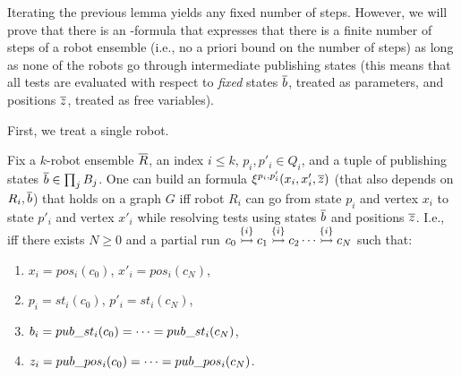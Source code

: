 Iterating the previous lemma yields any fixed number of steps. However, we will prove that there is an \msol-formula that expresses that there is a finite number of steps of a robot ensemble (i.e., no a priori bound on the number of steps) as long as none of the robots go through intermediate publishing states (this means that 
all tests are evaluated with respect to \emph{fixed} states $\tup{b}$, treated as parameters, and positions $\tup{z}$, treated as free variables).

First, we treat a single robot.

\begin{lemma} \label{lem:zeta} 
Fix a $k$-robot ensemble $\tup{R}$, an index $i \leq k$, $p_i,p'_i \in Q_i$, and a tuple of publishing states $\tup{b} \in \prod_j B_j$.
One can build an \msol formula $\xi^{p_i,p'_i}(x_i,x'_i,\tup{z})$ (that also depends on $R_i,\tup{b}$) that holds on a graph $G$ iff
robot $R_i$ can go from state $p_i$ and vertex $x_i$ to state $p'_i$ and vertex $x'_i$ while resolving tests using states $\tup{b}$ and positions $\tup{z}$.
I.e., iff
there exists $N \geq 0$ and a partial run  
$\onestep{c_0}{c_1}{\{i\}}\onestep{}{c_2}{\{i\}} \cdots \onestep{}{c_N}{\{i\}}$ such that:
\begin{enumerate}
 \item $x_i = pos_i(c_0)$, $x'_i = pos_i(c_N)$,
 \item $p_i = st_i(c_0)$, $p'_i = st_i(c_N)$,
 \item $b_i = \bcst_i(c_0) = \dots = \bcst_i(c_N)$,
 \item $z_i = \bcpos_i(c_0) = \dots = \bcpos_i(c_N)$.
 \end{enumerate}
\end{lemma}

